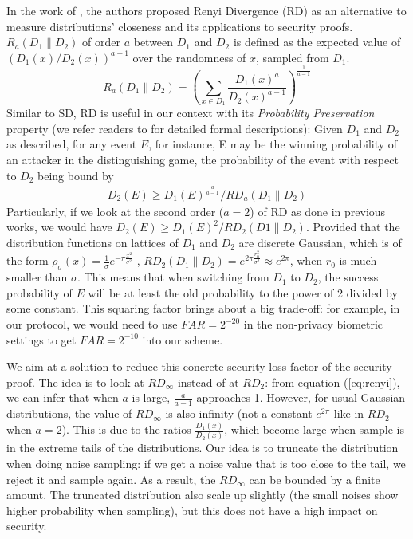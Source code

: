 In the work of \cite{bai2015improved}, the authors proposed Renyi Divergence (RD) as
an alternative to measure distributions' closeness and its applications to security proofs. $R_a(D_1\|D_2)$ of order $a$
between $D_1$ and $D_2$ is defined as the expected value of $(D_1(x)/D_2(x))^{a-1}$ over the randomness of $x$, sampled from $D_1$.
\[
R_a(D_1\|D_2) = \left( \sum_{x \in D_1}\frac{D_1(x)^a}{D_2(x)^{a-1}} \right)^
{\frac{1}{a-1}}
\]
Similar to SD, RD is useful in our context with its \textit{Probability Preservation} property (we refer readers to \cite{bai2015improved} for detailed formal
descriptions): Given $D_1$ and $D_2$ as described, for any event $E$, for instance, E may be the winning probability of an attacker in the distinguishing game, the probability of the event with respect to $D_2$ being bound by
\begin{align}
\label{eq:renyi}
D_2(E) \geq D_1(E)^{\frac{a}{a-1}}/RD_a(D_{1}\|D_2)
\end{align}
Particularly, if we look at the second order ($a = 2$) of RD as done in previous
works, we would have $ D_2(E) \geq D_1(E)^2/RD_2(D1\|D_2) $.  Provided that the
distribution functions on lattices of $D_1$ and $D_2$ are discrete Gaussian,
which is of the form
$\rho_\sigma(x) = \frac{1}{\sigma}e^{-\pi\frac{x^2} {\sigma^2}}$ ,
$RD_2(D_1\|D_2) = e^{2\pi \frac{r_0^2}{\sigma^2}} \approx e^{2\pi}$, when $r_0$
is much smaller than $\sigma$. This means that when switching from $D_1$ to $D_2$,
the success probability of $E$ will be at least the old probability to the power
of 2 divided by some constant. This squaring factor brings about a big trade-off: for
example, in our protocol, we would need to use $FAR = 2^{-20}$ in the
non-privacy biometric settings to get $FAR=2^{-10}$ into our scheme.

We aim at a solution to reduce this concrete security loss factor of the security proof. The idea is to look at $RD_\infty$
instead of at $RD_2$: from equation (\ref{eq:renyi}), we can infer that when $a$ is
large, $\frac{a}{a-1}$ approaches 1. However, for usual Gaussian distributions, the value of
$RD_\infty$ is also infinity (not a constant $e^{2\pi}$ like in $RD_2$ when
$a=2$). This is due to the ratios $\frac{D_1(x)}{D_2(x)}$, which become large when
sample is in the extreme tails of the distributions. Our idea is to
truncate the distribution when doing noise sampling: if we get a noise value
that is too close to the tail, we reject it and sample again. As a result, the $RD_{\infty}$ can be bounded by a finite amount. The
truncated distribution also scale up slightly (the small noises show
higher probability when sampling), but this does not have a high impact on security.



